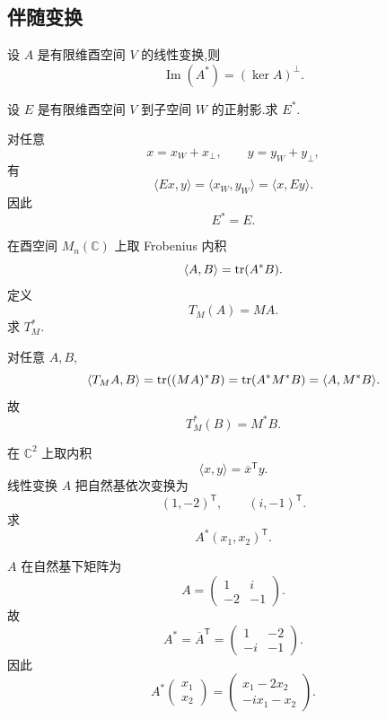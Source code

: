 \subsection{伴随变换}

\begin{proposition}[\markstar]
设 $A$ 是有限维酉空间 $V$ 的线性变换,则
\[
\operatorname{Im}(A^*)=(\ker A)^\perp.
\]
\end{proposition}


\begin{example}
设 $E$ 是有限维酉空间 $V$ 到子空间 $W$ 的正射影.求 $E^*$.
\end{example}
\exampleblank

\begin{solution}
对任意
\[
x=x_W+x_\perp,
\qquad
y=y_W+y_\perp,
\]
有
\[
\langle Ex,y\rangle
=
\langle x_W,y_W\rangle
=
\langle x,Ey\rangle.
\]
因此
\[
\boxed{E^*=E}.
\]
\end{solution}


\begin{example}
在酉空间 $M_n(\mathbb{C})$ 上取 Frobenius 内积
\[
\langle A,B\rangle
=
\operatorname{tr}(A^*B).
\]
定义
\[
T_M(A)=MA.
\]
求 $T_M^*$.
\end{example}
\exampleblank

\begin{solution}
对任意 $A,B$,
\[
\langle T_MA,B\rangle
=
\operatorname{tr}((MA)^*B)
=
\operatorname{tr}(A^*M^*B)
=
\langle A,M^*B\rangle.
\]
故
\[
\boxed{T_M^*(B)=M^*B}.
\]
\end{solution}


\begin{example}
在 $\mathbb{C}^2$ 上取内积
\[
\langle x,y\rangle=\overline{x}^{\mathsf T}y.
\]
线性变换 $A$ 把自然基依次变换为
\[
(1,-2)^{\mathsf T},
\qquad
(i,-1)^{\mathsf T}.
\]
求
\[
A^*(x_1,x_2)^{\mathsf T}.
\]
\end{example}
\exampleblank

\begin{solution}
$A$ 在自然基下矩阵为
\[
A=
\begin{pmatrix}
1&i\\
-2&-1
\end{pmatrix}.
\]
故
\[
A^*
=
\overline A^{\mathsf T}
=
\begin{pmatrix}
1&-2\\
-i&-1
\end{pmatrix}.
\]
因此
\[
\boxed{
A^*
\begin{pmatrix}x_1\\x_2\end{pmatrix}
=
\begin{pmatrix}
x_1-2x_2\\
-ix_1-x_2
\end{pmatrix}.
}
\]
\end{solution}


